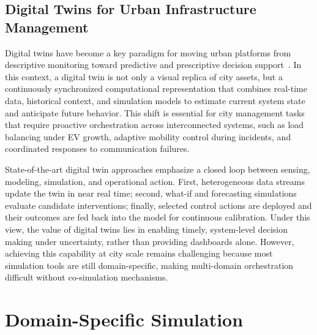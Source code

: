 \subsection{Digital Twins for Urban Infrastructure Management}

Digital twins have become a key paradigm for moving urban platforms from descriptive monitoring toward predictive and prescriptive decision support~\cite{digital_twin_cities}. In this context, a digital twin is not only a visual replica of city assets, but a continuously synchronized computational representation that combines real-time data, historical context, and simulation models to estimate current system state and anticipate future behavior. This shift is essential for city management tasks that require proactive orchestration across interconnected systems, such as load balancing under EV growth, adaptive mobility control during incidents, and coordinated responses to communication failures.

State-of-the-art digital twin approaches emphasize a closed loop between sensing, modeling, simulation, and operational action. First, heterogeneous data streams update the twin in near real time; second, what-if and forecasting simulations evaluate candidate interventions; finally, selected control actions are deployed and their outcomes are fed back into the model for continuous calibration. Under this view, the value of digital twins lies in enabling timely, system-level decision making under uncertainty, rather than providing dashboards alone. However, achieving this capability at city scale remains challenging because most simulation tools are still domain-specific, making multi-domain orchestration difficult without co-simulation mechanisms.



\section{Domain-Specific Simulation}

